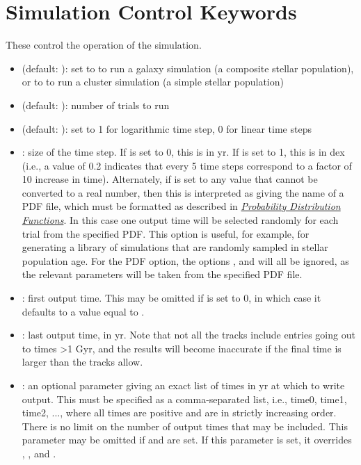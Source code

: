 \documentclass[letterpaper,10pt,english]{sphinxmanual}
\begin{document}
\section{Simulation Control Keywords}
\label{parameters:simulation-control-keywords}
These control the operation of the simulation.
\begin{itemize}
\item {} 
 (default: ): set to  to run a galaxy simulation (a composite stellar population), or to  to run a cluster simulation (a simple stellar population)

\item {} 
 (default: ): number of trials to run

\item {} 
 (default: ): set to 1 for logarithmic time step, 0 for linear time steps

\item {} 
: size of the time step. If  is set to 0, this is in yr. If  is set to 1, this is in dex (i.e., a value of 0.2 indicates that every 5 time steps correspond to a factor of 10 increase in time). Alternately, if  is set to any value that cannot be converted to a real number, then this is interpreted as giving the name of a PDF file, which must be formatted as described in {\hyperref[pdfs:sec-pdfs]{\emph{Probability Distribution Functions}}}. In this case one output time will be selected randomly for each trial from the specified PDF. This option is useful, for example, for generating a library of simulations that are randomly sampled in stellar population age. For the PDF option, the options ,  and  will all be ignored, as the relevant parameters will be taken from the specified PDF file.

\item {} 
: first output time. This may be omitted if  is set to 0, in which case it defaults to a value equal to .

\item {} 
: last output time, in yr. Note that not all the tracks include entries going out to times \textgreater{}1 Gyr, and the results will become inaccurate if the final time is larger than the tracks allow.

\item {} 
: an optional parameter giving an exact list of times in yr at which to write output. This must be specified as a comma-separated list, i.e., time0, time1, time2, ..., where all times are positive and are in strictly increasing order. There is no limit on the number of output times that may be included. This parameter may be omitted if  and  are set. If this parameter is set, it overrides , , and .


\end{itemize}
\end{document}
